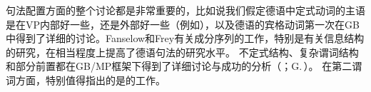 句法配置方面的整个讨论都是非常重要的，比如说我们假定德语中定式动词的主语是在VP内部好一些，还是外部好一些（例如\citealp*{Haider82,Grewendorf83a,Kratzer84a,Kratzer96a,Webelhuth85a,%
Sternefeld85b,%
Scherpenisse86a,%
Fanselow87a,Grewendorf88a,Duerscheid89a,Webelhuth90,%
Oppenrieder91a,%
Wilder91a,Haider93a,Grewendorf93,%
Frey93a,%
Lenerz94a,%
Meinunger2000a%
}），以及德语的宾格动词第一次在GB中得到了详细的讨论\citep{Grewendorf89a,Fanselow92}。Fanselow和Frey有关成分序列的工作，特别是有关信息结构的研究，在相当程度上提高了德语句法的研究水平\citep{Fanselow88,Fanselow90,Fanselow93a,Fanselow2000a,Fanselow2001a,Fanselow2003d,Fanselow2003a,Fanselow2004a,Frey2000a-u,Frey2001a,Frey2004a,Frey2005a}。
不定式结构、复杂谓词结构和部分前置都在GB/MP框架下得到了详细讨论与成功的分析（\citealp{Bierwisch63,Evers75a,Haider82,Haider86c,Haider90b,Haider91,Haider93a,Grewendorf83a,Grewendorf87a,Grewendorf88a,denBesten85b,Sternefeld85b,Fanselow87a,Fanselow2002a,SS88a,BK89a}；G.\,\citealp{GMueller96a,GMueller98a,VS98a}）。
在第二谓词方面，特别值得指出的是\citet{Winkler97a}的工作。

